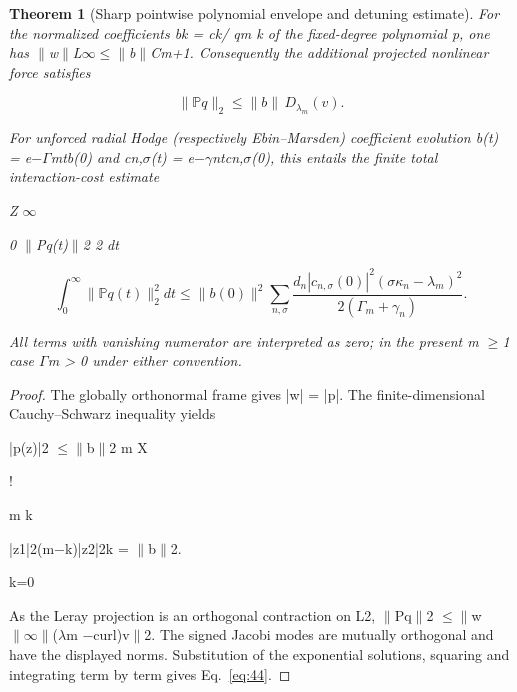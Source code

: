 \documentclass[10pt,letterpaper]{article}
\newtheorem{theorem}{Theorem}[section]
\theoremstyle{remark}
\begin{document}
\begin{theorem}[Sharp pointwise polynomial envelope and detuning estimate]

For the normalized coefficients bk = ck/ qm k  of the fixed-degree polynomial p, one has \(\| \)w\(\| \)L\(\infty \le \| \)b\(\| \)Cm+1. Consequently the additional projected nonlinear force satisfies


\begin{equation}
\tag{43}\label{eq:43}
\|\mathbb Pq\|_2\le\|b\|\,D_{\lambda_m}(v).
\end{equation}

For unforced radial Hodge (respectively Ebin–Marsden) coefficient evolution b(t) = e\(- \Gamma \)mtb(0) and cn,\(\sigma \)(t) = e\(- \gamma \)ntcn,\(\sigma \)(0), this entails the finite total interaction-cost estimate


Z \(\infty \)


0 \(\| \)Pq(t)\(\| \)2 2 dt



\begin{equation}
\tag{44}\label{eq:44}
\int_0^\infty\|\mathbb Pq(t)\|_2^2dt\le\|b(0)\|^2\sum_{n,\sigma}\frac{d_n|c_{n,\sigma}(0)|^2(\sigma\kappa_n-\lambda_m)^2}{2(\Gamma_m+\gamma_n)}.
\end{equation}

All terms with vanishing numerator are interpreted as zero; in the present m \(\ge \)1 case \(\Gamma \)m > 0 under either convention.


\end{theorem}

\begin{proof}
The globally orthonormal frame gives |w| = |p|. The finite-dimensional Cauchy–Schwarz inequality yields

|p(z)|2 \(\le \| \)b\(\| \)2 m X


!


m k


|z1|2(m\(- \)k)|z2|2k = \(\| \)b\(\| \)2.


k=0


As the Leray projection is an orthogonal contraction on L2, \(\| \)Pq\(\| \)2 \(\le \| \)w\(\| \infty \| \)(\(\lambda \)m \(- \)curl)v\(\| \)2. The signed Jacobi modes are mutually orthogonal and have the displayed norms. Substitution of the exponential solutions, squaring and integrating term by term gives Eq.~\eqref{eq:44}.


\end{proof}
\end{document}
